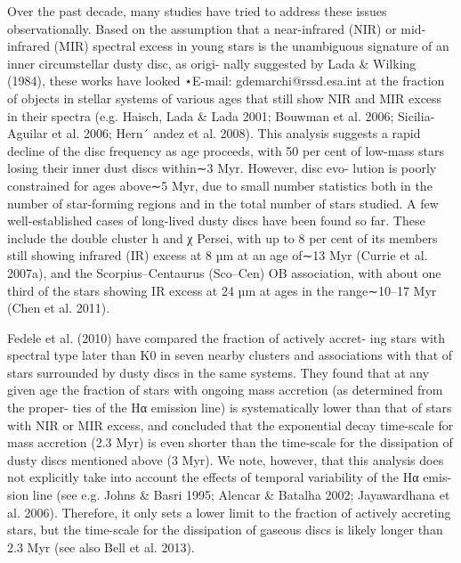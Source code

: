 \documentclass[../Main.tex]{subfiles}
\begin{document}
{Over the past decade, many studies have tried to address these
issues observationally. Based on the assumption that a near-infrared
(NIR) or mid-infrared (MIR) spectral excess in young stars is the
unambiguous signature of an inner circumstellar dusty disc, as origi-
nally suggested by Lada & Wilking (1984), these works have looked
⋆E-mail: gdemarchi@rssd.esa.int
at the fraction of objects in stellar systems of various ages that
still show NIR and MIR excess in their spectra (e.g. Haisch, Lada
& Lada 2001; Bouwman et al. 2006; Sicilia-Aguilar et al. 2006;
Hern´ andez et al. 2008). This analysis suggests a rapid decline of the
disc frequency as age proceeds, with 50 per cent of low-mass stars
losing their inner dust discs within∼3 Myr. However, disc evo-
lution is poorly constrained for ages above∼5 Myr, due to small
number statistics both in the number of star-forming regions and
in the total number of stars studied. A few well-established cases
of long-lived dusty discs have been found so far. These include the
double cluster h and χ Persei, with up to 8 per cent of its members
still showing infrared (IR) excess at 8 µm at an age of∼13 Myr
(Currie et al. 2007a), and the Scorpius–Centaurus (Sco–Cen) OB
association, with about one third of the stars showing IR excess at
24 µm at ages in the range∼10–17 Myr (Chen et al. 2011).

Fedele et al. (2010) have compared the fraction of actively accret-
ing stars with spectral type later than K0 in seven nearby clusters
and associations with that of stars surrounded by dusty discs in
the same systems. They found that at any given age the fraction of
stars with ongoing mass accretion (as determined from the proper-
ties of the Hα emission line) is systematically lower than that of
stars with NIR or MIR excess, and concluded that the exponential
decay time-scale for mass accretion (2.3 Myr) is even shorter than
the time-scale for the dissipation of dusty discs mentioned above
(3 Myr). We note, however, that this analysis does not explicitly
take into account the effects of temporal variability of the Hα emis-
sion line (see e.g. Johns & Basri 1995; Alencar & Batalha 2002;
Jayawardhana et al. 2006). Therefore, it only sets a lower limit to
the fraction of actively accreting stars, but the time-scale for the
dissipation of gaseous discs is likely longer than 2.3 Myr (see also
Bell et al. 2013).

}
\end{document}
